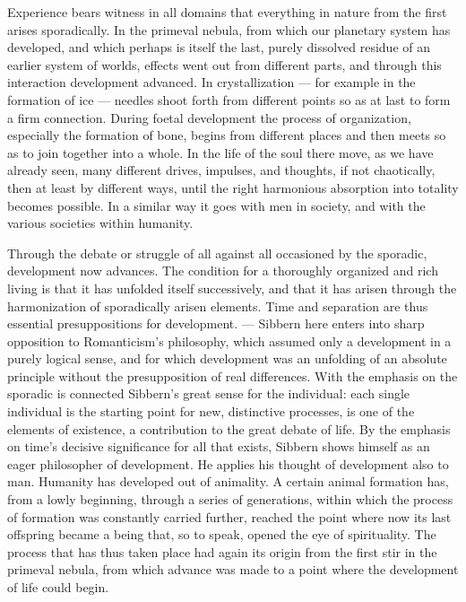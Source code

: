 \documentclass[12pt,a4paper]{book}
\newcommand{\opage}[1]{\marginnote{\footnotesize\textit{[#1]}}}
\begin{document}
Experience bears witness in all domains that everything in nature from the first arises
sporadically. In the primeval nebula, from which our planetary system has developed, and
which perhaps is itself the last, purely dissolved residue of an earlier system of worlds,
effects went out from different parts, and through this interaction development advanced. In
crystallization --- for example in the formation of ice --- needles shoot forth from
different points so as at last to form a firm connection. During foetal development the
process of organization, especially the formation of bone, begins from different places and
then meets so as to join together into a whole. In the life of the soul there move, as we
have already seen, many different drives, impulses, and thoughts, if not chaotically, then
at least by different ways, until the right harmonious absorption into totality becomes
possible. In a similar way it goes with men \opage{104}in society, and with the various societies
within humanity.

Through the debate or struggle of all against all occasioned by the sporadic, development
now advances. The condition for a thoroughly organized and rich living is that it has
unfolded itself successively, and that it has arisen through the harmonization of
sporadically arisen elements. Time and separation are thus essential presuppositions for
development. --- Sibbern here enters into sharp opposition to Romanticism's philosophy, which
assumed only a development in a purely logical sense, and for which development was an
unfolding of an absolute principle without the presupposition of real differences. With the
emphasis on the sporadic is connected Sibbern's great sense for the individual: each single
individual is the starting point for new, distinctive processes, is one of the elements of
existence, a contribution to the great debate of life. By the emphasis on time's decisive
significance for all that exists, Sibbern shows himself as an eager philosopher of
development. He applies his thought of development also to man. Humanity has developed out of
animality. A certain animal formation has, from a lowly beginning, through a series of
generations, within which the process of formation was constantly carried further, reached
the point where now its last offspring became a being that, so to speak, opened the eye of
spirituality. The process that has thus taken place had again its origin from the first stir
in the primeval nebula, from which advance was made to a point where the development of life
could begin.
\end{document}
